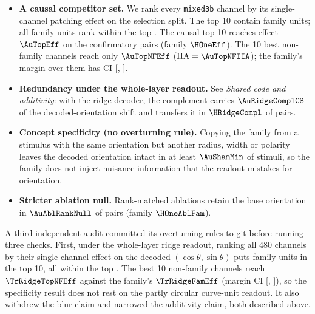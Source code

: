 \documentclass[11pt]{article}
\newcommand{\iia}{\mathrm{IIA}}
\begin{document}
\begin{itemize}
\item \textbf{A causal competitor set.} We rank every \texttt{mixed3b} channel by its single-channel patching effect on the selection split. The top 10 contain \AuTopOverlap{} family units; all family units rank within the top \AuFamRankMax. The causal top-10 reaches effect $\AuTopEff$ on the confirmatory pairs (family $\HOneEff$). The 10 best non-family channels reach only $\AuTopNFEff$ ($\iia=\AuTopNFIIA$); the family's margin over them has CI [\AuDiffNFLo, \AuDiffNFHi].
\item \textbf{Redundancy under the whole-layer readout.} See \emph{Shared code and additivity}: with the ridge decoder, the complement carries $\AuRidgeComplCS$ of the decoded-orientation shift and transfers it in $\HRidgeCompl$ of pairs.
\item \textbf{Concept specificity (no overturning rule).} Copying the family from a stimulus with the same orientation but another radius, width or polarity leaves the decoded orientation intact in at least $\AuShamMin$ of stimuli, so the family does not inject nuisance information that the readout mistakes for orientation.
\item \textbf{Stricter ablation null.} Rank-matched ablations retain the base orientation in $\AuAblRankNull$ of pairs (family $\HOneAblFam$).
\end{itemize}
A third independent audit committed its overturning rules to git before running three checks. First, under the whole-layer ridge readout, ranking all 480 channels by their single-channel effect on the decoded $(\cos\theta,\sin\theta)$ puts \TrRidgeOverlap{} family units in the top 10, all within the top \TrRidgeFamRankMax. The best 10 non-family channels reach $\TrRidgeTopNFEff$ against the family's $\TrRidgeFamEff$ (margin CI [\TrRidgeDiffNFLo, \TrRidgeDiffNFHi]), so the specificity result does not rest on the partly circular curve-unit readout. It also withdrew the blur claim and narrowed the additivity claim, both described above.
\end{document}
